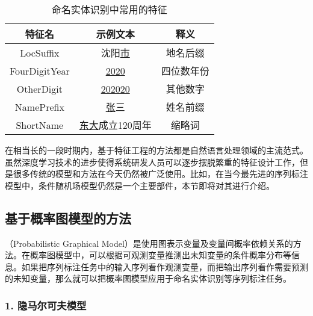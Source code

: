 \begin{table}[htp]{
\begin{center}
\caption{命名实体识别中常用的特征}
{
\begin{tabular}{c|c|c}
特征名 & 示例文本 & 释义 \\
\hline
\rule{0pt}{10pt} LocSuffix & 沈阳\underline{市} & 地名后缀 \\
\rule{0pt}{10pt} FourDigitYear & \underline{2020} & 四位数年份 \\
\rule{0pt}{10pt} OtherDigit & \underline{202020} & 其他数字 \\
\rule{0pt}{10pt} NamePrefix & \underline{张}三 & 姓名前缀 \\
\rule{0pt}{10pt} ShortName & \underline{东大}成立120周年 & 缩略词 \\
\end{tabular}
\label{tab:3.3-1}
}
\end{center}
}\end{table}

\parinterval 在相当长的一段时期内，基于特征工程的方法都是自然语言处理领域的主流范式。虽然深度学习技术的进步使得系统研发人员可以逐步摆脱繁重的特征设计工作，但是很多传统的模型和方法在今天仍然被广泛使用。比如，在当今最先进的序列标注模型中，条件随机场模型仍然是一个主要部件，本节即将对其进行介绍。


\subsection{基于概率图模型的方法}

（Probabilistic Graphical Model）是使用图表示变量及变量间概率依赖关系的方法。在概率图模型中，可以根据可观测变量推测出未知变量的条件概率分布等信息。如果把序列标注任务中的输入序列看作观测变量，而把输出序列看作需要预测的未知变量，那么就可以把概率图模型应用于命名实体识别等序列标注任务。


\subsubsection{1. 隐马尔可夫模型}

